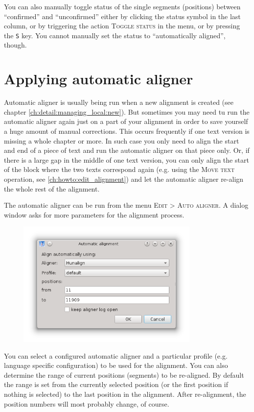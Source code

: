 \documentclass[a4paper,10pt,oneside]{book}
\newcommand{\keys}[1]{\texttt{#1}}
\newcommand{\menu}[1]{\textsc{#1}}
\begin{document}
You can also manually toggle status of the single segments (positions) between ``confirmed'' and ``unconfirmed'' either by clicking the status symbol in the last column, or by triggering the action \menu{Toggle status} in the menu, or by pressing the \keys{S} key. You cannot manually set the status to ``automatically aligned'', though.

\section{Applying automatic aligner}\label{ch:howto:autoalign}

Automatic aligner is usually being run when a new alignment is created (see chapter \ref{ch:detail:managing_local:new}). But sometimes you may need tu run the automatic aligner again just on a part of your alignment in order to save yourself a huge amount of manual corrections. This occurs frequently if one text version is missing a whole chapter or more. In such case you only need to align the start and end of a piece of text and run the automatic aligner on that piece only. Or, if there is a large gap in the middle of one text version, you can only align the start of the block where the two texts correspond again (e.g. using the \menu{Move text} operation, see \ref{ch:howto:edit_alignment}) and let the automatic aligner re-align the whole rest of the alignment.

The automatic aligner can be run from the menu \menu{Edit} > \menu{Auto aligner}. A dialog window asks for more parameters for the alignment process.


\begin{figure}[htbf]
 \includegraphics[width=0.8\textwidth]{screenshots/autoaligner.png}
\end{figure}

You can select a configured automatic aligner and a particular profile (e.g. language specific configuration) to be used for the alignment. You can also determine the range of current positions (segments) to be re-aligned. By default the range is set from the currently selected position (or the first position if nothing is selected) to the last position in the alignment. After re-alignment, the position numbers will most probably change, of course.
\end{document}

